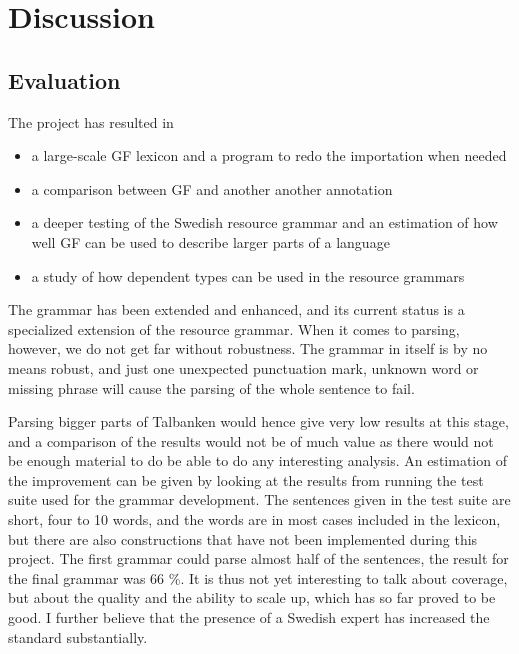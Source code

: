 \documentclass{report}
\begin{document}
\chapter{Discussion}
\label{sec:results}
\section{Evaluation}
The project has resulted in
\begin{itemize}
\item a large-scale GF lexicon and a program to redo the importation when needed
\item a comparison between GF and another another annotation
\item a deeper testing of the Swedish resource grammar and an estimation
of how well GF can be used to describe larger parts of a language
\item a study of how dependent types can be used in the resource grammars
\end{itemize}

The grammar has been extended and enhanced, and its current status is
a specialized extension of the resource grammar. When it comes to parsing,
however, we do not get far without robustness.
The grammar in itself is by no means robust, and just one 
unexpected punctuation mark, unknown word
or missing phrase will cause the parsing of the whole sentence to fail. 

Parsing bigger parts of Talbanken would hence give very low results at this stage, 
and a comparison of the results would not be of much value as
there would not be enough material %
to do be able to do any interesting analysis.
An estimation of the improvement can be given by looking at the results from
running the test suite used for the grammar development.
The sentences given in the test suite are short, four to 10 words, and the
words are in most cases included in
the lexicon, but there are also constructions that have not been implemented 
during this project.
The first grammar could parse almost half of the sentences, the result for the final
grammar was 66 \%. 
It is thus not yet interesting to talk about coverage, but about the quality and
the ability to scale up, which has so far proved to be good.
I further believe that the presence of a Swedish expert has
increased the standard substantially.\\
\end{document}
